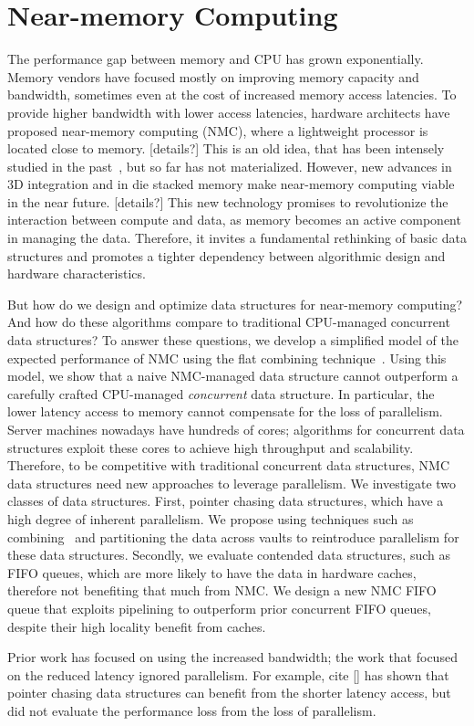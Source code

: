\section{Near-memory Computing}

The performance gap between memory and CPU has grown exponentially. Memory vendors have focused mostly on improving memory capacity and bandwidth, sometimes even at the cost of increased memory access latencies. To provide higher bandwidth with lower access latencies, hardware architects have proposed near-memory computing (NMC), where a lightweight processor is located close to memory. [details?] This is an old idea, that has been intensely studied in the past~\cite{}, but so far has not materialized. However, new advances in 3D integration and in die stacked memory make near-memory computing viable in the near future. [details?] This new technology promises to revolutionize the interaction between compute and data, as memory becomes an active component in managing the data. Therefore, it invites a fundamental rethinking of basic data structures and promotes a tighter dependency between algorithmic design and hardware characteristics. 

But how do we design and optimize data structures for near-memory computing? And how do these algorithms compare to traditional CPU-managed concurrent data structures? To answer these questions, we develop a simplified model of the expected performance of NMC using the flat combining technique~\cite{}. Using this model, we show that a naive NMC-managed data structure cannot outperform a carefully crafted CPU-managed \emph{concurrent} data structure. In particular, the lower latency access to memory cannot compensate for the loss of parallelism. Server machines nowadays have hundreds of cores; algorithms for concurrent data structures exploit these cores to achieve high throughput and scalability. Therefore, to be competitive with traditional concurrent data structures, NMC data structures need new approaches to leverage parallelism. We investigate two classes of data structures. First, pointer chasing data structures, which have a high degree of inherent parallelism. We propose using techniques such as combining~\cite{} and partitioning the data across vaults to reintroduce parallelism for these data structures. Secondly, we evaluate contended data structures, such as FIFO queues, which are more likely to have the data in hardware caches, therefore not benefiting that much from NMC. We design a new NMC FIFO queue that exploits pipelining to outperform prior concurrent FIFO queues, despite their high locality benefit from caches. 

Prior work has focused on using the increased bandwidth; the work that focused on the reduced latency ignored parallelism. For example, cite [] has shown that pointer chasing data structures can benefit from the shorter latency access, but did not evaluate the performance loss from the loss of parallelism. 

